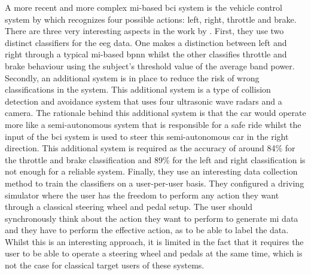 A more recent and more complex \gls{mi}-based \gls{bci} system is the vehicle control system by \citet{bci_mi_four_wheel_drive} which recognizes four possible actions: left, right, throttle and brake.
There are three very interesting aspects in the work by \citet{bci_mi_four_wheel_drive}.
First, they use two distinct classifiers for the \gls{eeg} data.
One makes a distinction between left and right through a typical \gls{mi}-based \gls{bpnn} whilst the other classifies throttle and brake behaviour using the subject’s threshold value of the average band power.
Secondly, an additional system is in place to reduce the risk of wrong classifications in the system.
This additional system is a type of collision detection and avoidance system that uses four ultrasonic wave radars and a camera.
The rationale behind this additional system is that the car would operate more like a semi-autonomous system that is responsible for a safe ride whilst the input of the \gls{bci} system is used to steer this semi-autonomous car in the right direction.
This additional system is required as the accuracy of around 84\% for the throttle and brake classification and 89\% for the left and right classification is not enough for a reliable system.
Finally, they use an interesting data collection method to train the classifiers on a user-per-user basis.
They configured a driving simulator where the user has the freedom to perform any action they want through a classical steering wheel and pedal setup.
The user should synchronously think about the action they want to perform to generate \gls{mi} data and they have to perform the effective action, as to be able to label the data.
Whilst this is an interesting approach, it is limited in the fact that it requires the user to be able to operate a steering wheel and pedals at the same time, which is not the case for classical target users of these systems.

